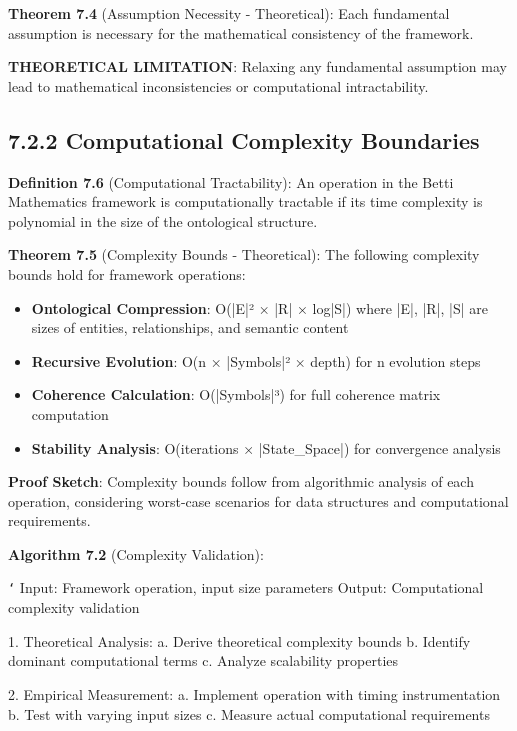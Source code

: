 \textbf{Theorem 7.4} (Assumption Necessity - Theoretical): Each fundamental assumption is necessary for the mathematical consistency of the framework.

\textbf{THEORETICAL LIMITATION}: Relaxing any fundamental assumption may lead to mathematical inconsistencies or computational intractability.

\subsection{7.2.2 Computational Complexity Boundaries}

\textbf{Definition 7.6} (Computational Tractability): An operation in the Betti Mathematics framework is computationally tractable if its time complexity is polynomial in the size of the ontological structure.

\textbf{Theorem 7.5} (Complexity Bounds - Theoretical): The following complexity bounds hold for framework operations:

\begin{itemize}
\item \textbf{Ontological Compression}: O(|E|² × |R| × log|S|) where |E|, |R|, |S| are sizes of entities, relationships, and semantic content
\item \textbf{Recursive Evolution}: O(n × |Symbols|² × depth) for n evolution steps
\item \textbf{Coherence Calculation}: O(|Symbols|³) for full coherence matrix computation
\item \textbf{Stability Analysis}: O(iterations × |State_Space|) for convergence analysis
\end{itemize}

\textbf{Proof Sketch}: Complexity bounds follow from algorithmic analysis of each operation, considering worst-case scenarios for data structures and computational requirements.

\textbf{Algorithm 7.2} (Complexity Validation):

\texttt{`}
Input: Framework operation, input size parameters
Output: Computational complexity validation

1. Theoretical Analysis:
   a. Derive theoretical complexity bounds
   b. Identify dominant computational terms
   c. Analyze scalability properties
   
2. Empirical Measurement:
   a. Implement operation with timing instrumentation
   b. Test with varying input sizes
   c. Measure actual computational requirements
   
